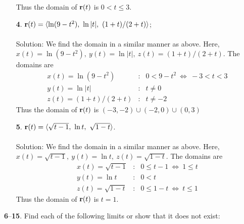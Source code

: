 \documentclass[12pt]{amsbook}
\newcommand{\la}{\langle}
\newcommand{\ra}{\rangle}
\begin{document}
\begin{enumerate}
  Thus the domain of ${\bf r}(t)$ is $0<t\leq 3$.
  \\
  \item[{\small\bf 4}.] ${\bf r}(t)=\la \ln(9-t^2), \ \ln |t|, \ (1+t)/(2+t) \ra$;
  \\
  \\
  {\sc Solution}: We find the domain in a similar manner as above. Here, $x(t)=\ln(9-t^2), \ y(t)=\ln |t|, \ z(t)=(1+t)/(2+t)$. The domains are
    \begin{eqnarray*}
  x(t)=\ln(9-t^2)&:& 0< 9-t^2 \ \Leftrightarrow \ -3< t < 3 \\
  y(t)=\ln |t|&:& t\neq 0 \\
  z(t)=(1+t)/(2+t)&:& t\neq -2
  \end{eqnarray*}
  Thus the domain of ${\bf r}(t)$ is $(-3,-2)\cup(-2,0)\cup(0,3)$
  \\
  \item[{\small\bf 5}.] ${\bf r}(t)=\la \sqrt{t-1}, \ \ln t, \ \sqrt{1-t} \ra$.
  \\
  \\
  {\sc Solution}: We find the domain in a similar manner as above. Here, $x(t)=\sqrt{t-1}, \ y(t)=\ln t, \ z(t)=\sqrt{1-t}$. The domains are
    \begin{eqnarray*}
  x(t)=\sqrt{t-1}&:& 0\leq t-1 \ \Leftrightarrow \ 1\leq t  \\
  y(t)=\ln t&:& 0<t \\
  z(t)=\sqrt{1-t}&:& 0\leq 1-t \ \Leftrightarrow \ t\leq 1
  \end{eqnarray*}
  Thus the domain of ${\bf r}(t)$ is $t=1$.
  \\
\end{enumerate}
\noindent
{\small {\bf 6}--{\bf 15}}. Find each of the following limits or show that it does not exist:
\end{document}
